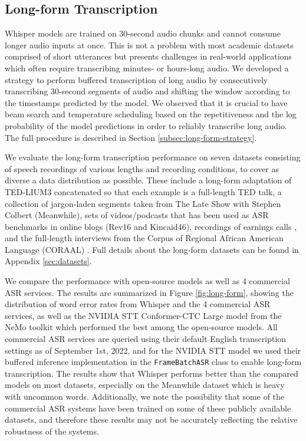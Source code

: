 \subsection{Long-form Transcription}\label{subsec:long-form}

Whisper models are trained on 30-second audio chunks and cannot consume longer audio inputs at once. This is not a problem with most academic datasets comprised of short utterances but presents challenges in real-world applications which often require transcribing minutes- or hours-long audio. We developed a strategy to perform buffered transcription of long audio by consecutively transcribing 30-second segments of audio and shifting the window according to the timestamps predicted by the model. We observed that it is crucial to have beam search and temperature scheduling based on the repetitiveness and the log probability of the model predictions in order to reliably transcribe long audio. The full procedure is described in Section \ref{subsec:long-form-strategy}.

We evaluate the long-form transcription performance on seven datasets consisting of speech recordings of various lengths and recording conditions, to cover as diverse a data distribution as possible. These include a long-form adaptation of TED-LIUM3 \cite{Hernandez2018TEDLIUM3T} concatenated so that each example is a full-length TED talk, a collection of jargon-laden segments taken from The Late Show with Stephen Colbert (Meanwhile), sets of videos/podcasts that has been used as ASR benchmarks in online blogs (Rev16 and Kincaid46), recordings of earnings calls \cite{del2021earnings}, and the full-length interviews from the Corpus of Regional African American Language (CORAAL) \cite{gunter2021contextualizing}. Full details about the long-form datasets can be found in Appendix \ref{sec:datasets}.

We compare the performance with open-source models as well as 4 commercial ASR services. The results are summarized in Figure \ref{fig:long-form}, showing the distribution of word error rates from Whisper and the 4 commercial ASR services, as well as the NVIDIA STT Conformer-CTC Large model from the NeMo toolkit \cite{kuchaiev2019nemo} which performed the best among the open-source models. All commercial ASR services are queried using their default English transcription settings as of September 1st, 2022, and for the NVIDIA STT model we used their buffered inference implementation in the \texttt{FrameBatchASR} class to enable long-form transcription. The results show that Whisper performs better than the compared models on most datasets, especially on the Meanwhile dataset which is heavy with uncommon words. Additionally, we note the possibility that some of the commercial ASR systems have been trained on some of these publicly available datasets, and therefore these results may not be accurately reflecting the relative robustness of the systems.


